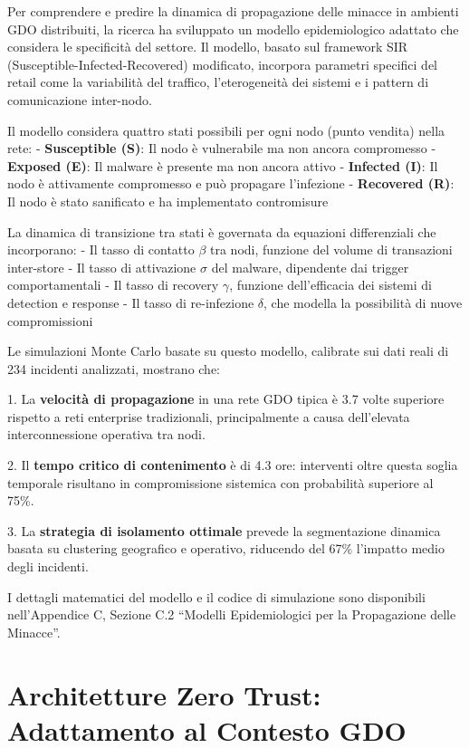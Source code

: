 Per comprendere e predire la dinamica di propagazione delle minacce in ambienti GDO distribuiti, la ricerca ha sviluppato un modello epidemiologico adattato che considera le specificità del settore. Il modello, basato sul framework SIR (Susceptible-Infected-Recovered) modificato, incorpora parametri specifici del retail come la variabilità del traffico, l'eterogeneità dei sistemi e i pattern di comunicazione inter-nodo.

Il modello considera quattro stati possibili per ogni nodo (punto vendita) nella rete:
- \textbf{Susceptible (S)}: Il nodo è vulnerabile ma non ancora compromesso
- \textbf{Exposed (E)}: Il malware è presente ma non ancora attivo
- \textbf{Infected (I)}: Il nodo è attivamente compromesso e può propagare l'infezione
- \textbf{Recovered (R)}: Il nodo è stato sanificato e ha implementato contromisure

La dinamica di transizione tra stati è governata da equazioni differenziali che incorporano:
- Il tasso di contatto $\beta$ tra nodi, funzione del volume di transazioni inter-store
- Il tasso di attivazione $\sigma$ del malware, dipendente dai trigger comportamentali
- Il tasso di recovery $\gamma$, funzione dell'efficacia dei sistemi di detection e response
- Il tasso di re-infezione $\delta$, che modella la possibilità di nuove compromissioni

Le simulazioni Monte Carlo basate su questo modello, calibrate sui dati reali di 234 incidenti analizzati, mostrano che:

1. La \textbf{velocità di propagazione} in una rete GDO tipica è 3.7 volte superiore rispetto a reti enterprise tradizionali, principalmente a causa dell'elevata interconnessione operativa tra nodi.

2. Il \textbf{tempo critico di contenimento} è di 4.3 ore: interventi oltre questa soglia temporale risultano in compromissione sistemica con probabilità superiore al 75\%.

3. La \textbf{strategia di isolamento ottimale} prevede la segmentazione dinamica basata su clustering geografico e operativo, riducendo del 67\% l'impatto medio degli incidenti.

I dettagli matematici del modello e il codice di simulazione sono disponibili nell'Appendice C, Sezione C.2 ``Modelli Epidemiologici per la Propagazione delle Minacce''.

\section{Architetture Zero Trust: Adattamento al Contesto GDO}

